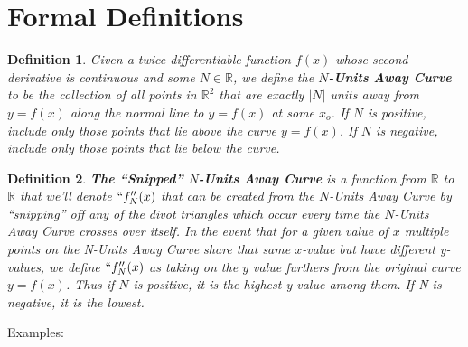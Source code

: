 \newtheorem{myDef}{Definition}

\section{Formal Definitions}

\begin{myDef}
    Given a twice differentiable function $f(x)$ whose second derivative is continuous and some $N \in \mathbb{R}$, we define the \textbf{$N$-Units Away Curve} to be the collection of all points in $\mathbb{R}^2$ that are exactly $|N|$ units away from $y=f(x)$ along the normal line to $y=f(x)$ at some $x_o$. If $N$ is positive, include only those points that lie above the curve $y=f(x)$. If $N$ is negative, include only those points that lie below the curve.
\end{myDef}

\begin{myDef}
    \textbf{The ``Snipped'' $N$-Units Away Curve} is a function from $\mathbb{R}$ to $\mathbb{R}$ that we’ll denote $``f_N''(x)$ that can be created from the $N$-Units Away Curve by ``snipping'' off any of the divot triangles which occur every time the $N$-Units Away Curve crosses over itself. In the event that for a given value of $x$ multiple points on the N-Units Away Curve share that same $x$-value but have different y-values, we define $``f_N''(x)$ as taking on the $y$ value furthers from the original curve $y = f(x)$. Thus if $N$ is positive, it is the highest y value among them. If N is negative, it is the lowest.
\end{myDef}

Examples:


